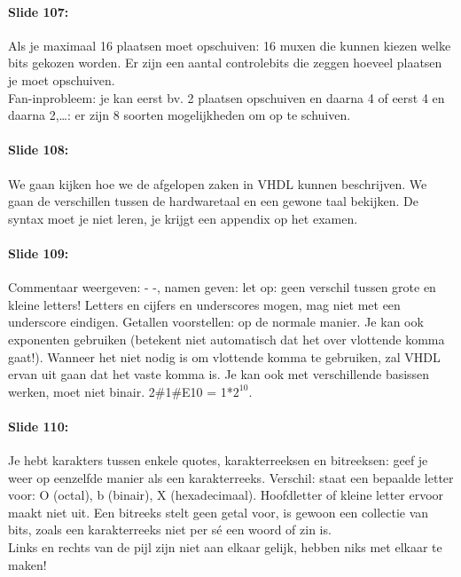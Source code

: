 \documentclass[10pt,a4paper]{book}
\begin{document}
\paragraph{Slide 107:} Als je maximaal 16 plaatsen moet opschuiven: 16 muxen die kunnen kiezen welke bits gekozen worden. Er zijn een aantal controlebits die zeggen hoeveel plaatsen je moet opschuiven.\\
Fan-inprobleem: je kan eerst bv. 2 plaatsen opschuiven en daarna 4 of eerst 4 en daarna 2,\ldots: er zijn 8 soorten mogelijkheden om op te schuiven.

\paragraph{Slide 108:} We gaan kijken hoe we de afgelopen zaken in VHDL kunnen beschrijven. We gaan de verschillen tussen de hardwaretaal en een gewone taal bekijken. De syntax moet je niet leren, je krijgt een appendix op het examen. 

\paragraph{Slide 109:} Commentaar weergeven: - -, namen geven: let op: geen verschil tussen grote en kleine letters! Letters en cijfers en underscores mogen, mag niet met een underscore eindigen. Getallen voorstellen: op de normale manier. Je kan ook exponenten gebruiken (betekent niet automatisch dat het over vlottende komma gaat!). Wanneer het niet nodig is om vlottende komma te gebruiken, zal VHDL ervan uit gaan dat het vaste komma is. Je kan ook met verschillende basissen werken, moet niet binair. 2\#1\#E10 = 1*$2^10$.

\paragraph{Slide 110:} Je hebt karakters tussen enkele quotes, karakterreeksen en bitreeksen: geef je weer op eenzelfde manier als een karakterreeks. Verschil: staat een bepaalde letter voor: O (octal), b (binair), X (hexadecimaal). Hoofdletter of kleine letter ervoor maakt niet uit. Een bitreeks stelt geen getal voor, is gewoon een collectie van bits, zoals een karakterreeks niet per s\'e een woord of zin is.\\
Links en rechts van de pijl zijn niet aan elkaar gelijk, hebben niks met elkaar te maken!
\end{document}
